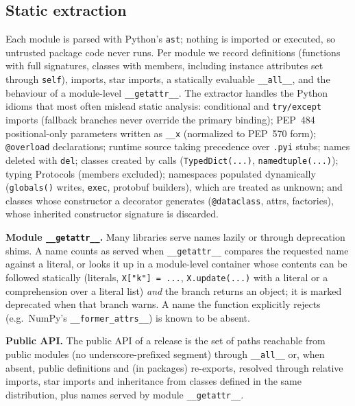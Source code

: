 \documentclass[10pt,twocolumn,letterpaper]{article}
\begin{document}
\subsection{Static extraction}
Each module is parsed with Python's \texttt{ast}; nothing is imported or executed, so untrusted package code never
runs. Per module we record definitions (functions with full signatures, classes with members, including instance
attributes set through \texttt{self}), imports, star imports, a statically evaluable \texttt{\_\_all\_\_}, and the
behaviour of a module-level \texttt{\_\_getattr\_\_}. The extractor handles the Python idioms that most often mislead static analysis: conditional and \texttt{try/except} imports (fallback branches never
override the primary binding); PEP~484 positional-only parameters written as \texttt{\_\_x} (normalized to PEP~570
form); \texttt{@overload} declarations; runtime source taking precedence over \texttt{.pyi} stubs; names deleted with
\texttt{del}; classes created by calls (\texttt{TypedDict(...)}, \texttt{namedtuple(...)}); typing Protocols (members
excluded); namespaces populated dynamically (\texttt{globals()} writes, \texttt{exec}, protobuf builders), which are
treated as unknown; and classes whose constructor a decorator generates (\texttt{@dataclass}, attrs, factories), whose
inherited constructor signature is discarded.

\textbf{Module \texttt{\_\_getattr\_\_}.} Many libraries serve names lazily or through deprecation shims. A name counts
as served when \texttt{\_\_getattr\_\_} compares the requested name against a literal, or looks it up in a module-level
container whose contents can be followed statically (literals, \texttt{X["k"] = ...}, \texttt{X.update(...)} with a
literal or a comprehension over a literal list) \emph{and} the branch returns an object; it is marked deprecated when
that branch warns. A name the function explicitly rejects (e.g.\ NumPy's \texttt{\_\_former\_attrs\_\_}) is known to
be absent.

\textbf{Public API.} The public API of a release is the set of paths reachable from public modules (no
underscore-prefixed segment) through \texttt{\_\_all\_\_} or, when absent, public definitions and (in packages)
re-exports, resolved through relative imports, star imports and inheritance from classes defined in the same
distribution, plus names served by module \texttt{\_\_getattr\_\_}.
\end{document}
